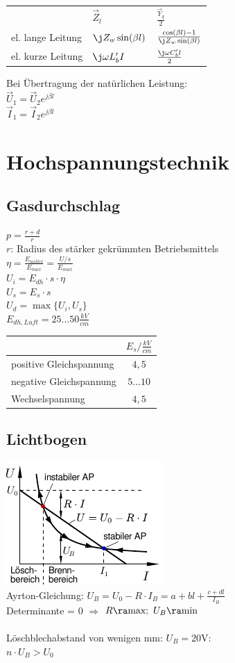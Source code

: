\documentclass[european]{latex4ei_sheet}
\begin{document}
		
		\begin{tabular}{lll}
		& $\vec Z_l$ & $\frac{\vec Y_q}{2}$\\[0.5em] \mrule
		el. lange Leitung & $\j Z_w \sin(\beta l)$ & $\frac{\cos(\beta l) -1}{\j Z_w \sin(\beta l)}$\\[0.5em]
		el. kurze Leitung & $\j \omega L'_b I$ & $\frac{\j \omega C'_b l}{2}$\\[0.5em]
		\end{tabular}
		
		Bei Übertragung der natürlichen Leistung: \\
		$\vec U_1 = \vec U_2 e^{j \beta l}$ \\
		$\vec I_1 = \vec I_2 e^{j \beta l}$ \\


	\section{Hochspannungstechnik}
		\subsection{Gasdurchschlag}
		$p = \frac{r + d}{r}$ \\
		$r$: Radius des stärker gekrümmten Betriebsmittels \\
		$\eta = \frac{E_{mittel}}{E_{max}} = \frac{U/s}{E_{max}}$ \\
		$U_i = E_{dh} \cdot s \cdot \eta$ \\
		$U_s = E_s \cdot s$ \\
		$U_d = \max\{U_i, U_s\}$ \\
		$E_{dh,Luft} = 25 \hdots 50 \frac{kV}{cm}$ \\
		\begin{tabular}{l|c}
		 & $E_s / \frac{kV}{cm}$ \\ \hline
		 positive Gleichspannung & $4,5$ \\ \hline
		 negative Gleichspannung & $5 \hdots 10$ \\ \hline
		 Wechselspannung & $4,5$
		\end{tabular}

	\subsection{Lichtbogen}
	\includegraphics{./img/Lichtbogen.pdf}\\
	Ayrton-Gleichung: $U_B = U_0 - R \cdot I_B = a + bl + \frac{c+dl}{I_B}$\\
	Determinante = 0 \quad $\Longrightarrow$ \quad $R \ra \text{max};\ U_{B} \ra \text{min}$\\
	\\
	Löschblechabstand von wenigen mm: $U_B = 20$V:\\
	$n \cdot U_B > U_0$

\end{document}
